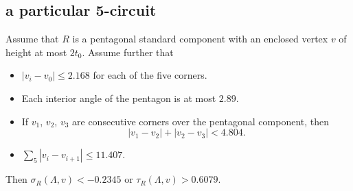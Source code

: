 %
%
%
%
%



\subsection{a particular 5-circuit} %

\begin{lemma}\label{lemma:6079}  
Assume that $R$ is a pentagonal standard component
    with an enclosed vertex $v$ of height at most $2t_0$.
    Assume further that
    \begin{itemize}
        \item $|v_i-v_0|\le 2.168$ for each of the five corners.
        \item Each interior angle of the pentagon is at most
        $2.89$.
        \item If $v_1$, $v_2$, $v_3$ are consecutive corners over
        the pentagonal component, then $$|v_1-v_2|+|v_2-v_3|<4.804.$$
        \item $\sum_5 |v_i-v_{i+1}|\le 11.407.$
    \end{itemize}
    Then $\sigma_R(\Lambda,v)< -0.2345$ or $\tau_R(\Lambda,v) > 0.6079.$
\end{lemma}

